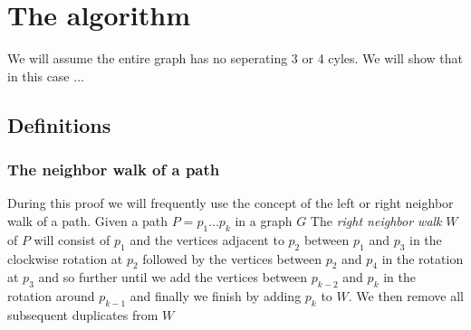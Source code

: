\renewcommand{\Q}{\scr Q}

\section{The algorithm}

We will assume the entire graph has no seperating 3 or 4 cyles. We will show that in this case ...

\subsection{Definitions}
  \subsubsection{The neighbor walk of a path}
    During this proof we will frequently use the concept of the left or right neighbor walk of a path.
    Given a path $P = p_1 \ldots p_k$ in a graph $G$
    The \emph{right neighbor walk} $W$ of $P$ will consist of $p_1$ and the vertices adjacent to $p_{2}$ between $p_1$ and $p_{3}$ in the clockwise rotation at $p_{2}$ followed by the vertices between $p_{2}$ and $p_{4}$ in the rotation at $p_{3}$ and so further until we add the vertices between $p_{k-2}$ and $p_k$ in the rotation around $p_{k-1}$ and finally we finish by adding $p_k$ to $W$.
    We then remove all subsequent duplicates from $W$

